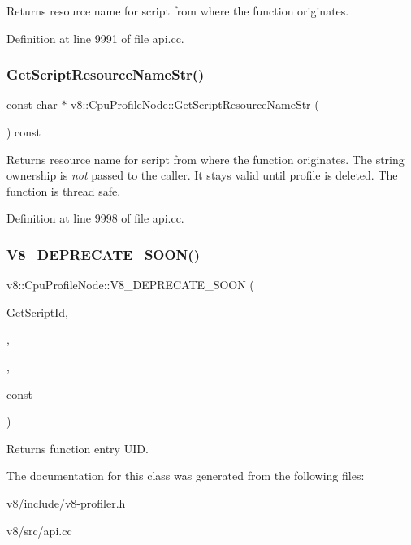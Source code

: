 Returns resource name for script from where the function originates. 

Definition at line 9991 of file api.\+cc.

\mbox{\label{classv8_1_1CpuProfileNode_a6efc31aba575973641d6ada68d9bf4ff}} 
\subsubsection{\texorpdfstring{Get\+Script\+Resource\+Name\+Str()}{GetScriptResourceNameStr()}}
{\footnotesize\ttfamily const \mbox{\hyperlink{classchar}{char}} $\ast$ v8\+::\+Cpu\+Profile\+Node\+::\+Get\+Script\+Resource\+Name\+Str (\begin{DoxyParamCaption}{ }\end{DoxyParamCaption}) const}

Returns resource name for script from where the function originates. The string ownership is {\itshape not} passed to the caller. It stays valid until profile is deleted. The function is thread safe. 

Definition at line 9998 of file api.\+cc.

\mbox{\label{classv8_1_1CpuProfileNode_a5285f35c759e2b0afa74f4db0e0bc50c}} 
\subsubsection{\texorpdfstring{V8\+\_\+\+D\+E\+P\+R\+E\+C\+A\+T\+E\+\_\+\+S\+O\+O\+N()}{V8\_DEPRECATE\_SOON()}}
{\footnotesize\ttfamily v8\+::\+Cpu\+Profile\+Node\+::\+V8\+\_\+\+D\+E\+P\+R\+E\+C\+A\+T\+E\+\_\+\+S\+O\+ON (\begin{DoxyParamCaption}\item[{\char`\"{}Use}]{Get\+Script\+Id,  }\item[{\mbox{\hyperlink{classv8_1_1CpuProfileNode_a6616c8d1893da19183d57e6488eb2743}{Get\+Line\+Number}}}]{,  }\item[{and \mbox{\hyperlink{classv8_1_1CpuProfileNode_a9df61090cf365f1f03d5bce44653f1f5}{Get\+Column\+Number}} instead.\char`\"{}}]{,  }\item[{\mbox{\hyperlink{classunsigned}{unsigned}} Get\+Call\+Uid()}]{const }\end{DoxyParamCaption})}

Returns function entry U\+ID. 

The documentation for this class was generated from the following files\+:\begin{DoxyCompactItemize}
\item 
v8/include/v8-\/profiler.\+h\item 
v8/src/api.\+cc\end{DoxyCompactItemize}
